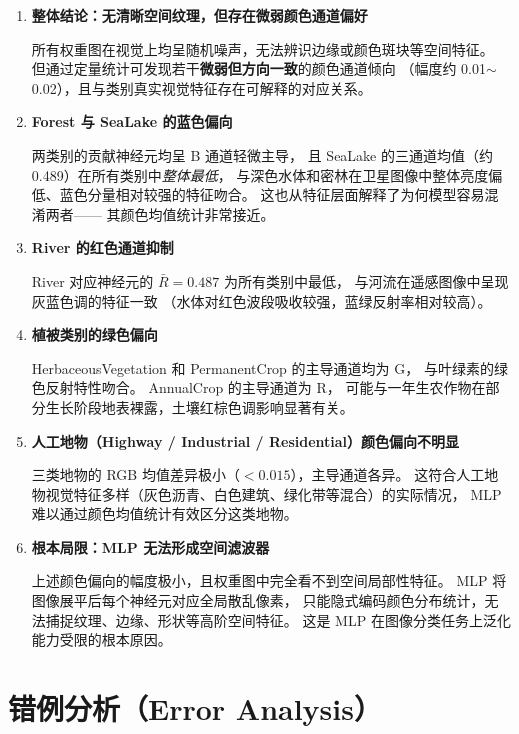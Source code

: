 \documentclass[12pt, a4paper]{article}
\begin{document}
\begin{enumerate}[leftmargin=2em, label=\textbf{(\arabic*)}]
  \item \textbf{整体结论：无清晰空间纹理，但存在微弱颜色通道偏好}

    所有权重图在视觉上均呈随机噪声，无法辨识边缘或颜色斑块等空间特征。
    但通过定量统计可发现若干\textbf{微弱但方向一致}的颜色通道倾向
    （幅度约 0.01$\sim$0.02），且与类别真实视觉特征存在可解释的对应关系。

  \item \textbf{Forest 与 SeaLake 的蓝色偏向}

    两类别的贡献神经元均呈 B 通道轻微主导，
    且 SeaLake 的三通道均值（约 0.489）在所有类别中\emph{整体最低}，
    与深色水体和密林在卫星图像中整体亮度偏低、蓝色分量相对较强的特征吻合。
    这也从特征层面解释了为何模型容易混淆两者——
    其颜色均值统计非常接近。

  \item \textbf{River 的红色通道抑制}

    River 对应神经元的 $\bar{R} = 0.487$ 为所有类别中最低，
    与河流在遥感图像中呈现灰蓝色调的特征一致
    （水体对红色波段吸收较强，蓝绿反射率相对较高）。

  \item \textbf{植被类别的绿色偏向}

    HerbaceousVegetation 和 PermanentCrop 的主导通道均为 G，
    与叶绿素的绿色反射特性吻合。
    AnnualCrop 的主导通道为 R，
    可能与一年生农作物在部分生长阶段地表裸露，土壤红棕色调影响显著有关。

  \item \textbf{人工地物（Highway / Industrial / Residential）颜色偏向不明显}

    三类地物的 RGB 均值差异极小（$<0.015$），主导通道各异。
    这符合人工地物视觉特征多样（灰色沥青、白色建筑、绿化带等混合）的实际情况，
    MLP 难以通过颜色均值统计有效区分这类地物。

  \item \textbf{根本局限：MLP 无法形成空间滤波器}

    上述颜色偏向的幅度极小，且权重图中完全看不到空间局部性特征。
    MLP 将图像展平后每个神经元对应全局散乱像素，
    只能隐式编码颜色分布统计，无法捕捉纹理、边缘、形状等高阶空间特征。
    这是 MLP 在图像分类任务上泛化能力受限的根本原因。
\end{enumerate}

\section{错例分析（Error Analysis）}
\end{document}
